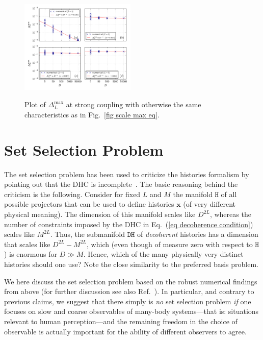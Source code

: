 \documentclass[pre,onecolumn,12pt,aps,longbibliography,nofootinbib]{revtex4-2}
\newcommand{\bb}[1]{\textbf{#1}}
\newcommand{\blue}[1]{#1}
\begin{document}
\begin{figure}[t]
 \centering\includegraphics[width=0.49\textwidth,clip=true]{Max_1_eq.pdf}
 \label{fig scale max eq fast}\vspace{-0.5cm}
 \caption{Plot of $\Delta_L^\text{max}$ at strong coupling with otherwise the same characteristics as in Fig.~\ref{fig scale max eq}. }
\end{figure}

\section{\blue{Set Selection Problem}}
\label{sec consequences}


The set selection problem has been used to criticize the histories formalism by pointing out that the DHC is incomplete~\cite{PazZurekPRD1993, DowkerKentPRL1995, DowkerKentJSP1996, KentPS1998, ZurekRMP2003, RiedelZurekZwolakPRA2016, SchlosshauerPR2019, ZurekEnt2022}. The basic reasoning behind the criticism is the following. Consider for fixed $L$ and $M$ the manifold $\texttt{H}$ of all possible projectors that can be used to define histories $\bb x$ (of very different physical meaning). The dimension of this manifold scales like $D^{2L}$, whereas the number of constraints imposed by the DHC in Eq.~(\ref{eq decoherence condition}) scales like $M^{2L}$. Thus, the submanifold $\texttt{DH}$ of \emph{decoherent} histories has a dimension that scales like $D^{2L} - M^{2L}$, which (even though of measure zero with respect to $\texttt{H}$) is enormous for $D\gg M$. Hence, which of the many physically very distinct histories should one use? Note the close similarity to the preferred basis problem.

\blue{We here discuss the set selection problem based on the robust numerical findings from above (for further discussion see also Ref.~\cite{Griffiths2019}). In particular, and contrary to previous claims, we suggest that there simply is} \emph{no} set selection problem \emph{if} one focuses on slow and coarse observables of many-body systems---that is: situations relevant to human perception---and the remaining \blue{freedom in the choice of observable} is actually important \blue{for the ability of different observers to agree}.
\end{document}
